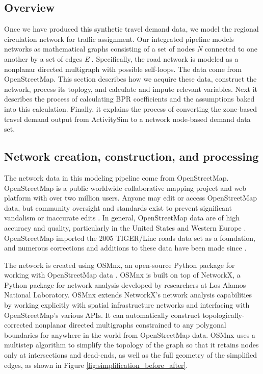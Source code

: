 \subsection{Overview}\label{network}

Once we have produced this synthetic travel demand data, we model the regional circulation network for traffic assignment. Our integrated pipeline models networks as mathematical graphs consisting of a set of nodes \textit{N} connected to one another by a set of edges \textit{E} \citep{newman_networks:_2010,gastner_spatial_2006}. Specifically, the road network is modeled as a nonplanar directed multigraph with possible self-loops. The data come from OpenStreetMap. This section describes how we acquire these data, construct the network, process its toplogy, and calculate and impute relevant variables. Next it describes the process of calculating BPR coefficients and the assumptions baked into this calculation. Finally, it explains the process of converting the zone-based travel demand output from ActivitySim to a network node-based demand data set. 

\subsection{Network creation, construction, and processing}

The network data in this modeling pipeline come from OpenStreetMap. OpenStreetMap is a public worldwide collaborative mapping project and web platform with over two million users. Anyone may edit or access OpenStreetMap data, but community oversight and standards exist to prevent significant vandalism or inaccurate edits \citep{jokar_arsanjani_openstreetmap_2015}. In general, OpenStreetMap data are of high accuracy and quality, particularly in the United States and Western Europe \citep{corcoran_analysing_2013,over_generating_2010,haklay_how_2010,maron_how_2015}. OpenStreetMap imported the 2005 TIGER/Line roads data set as a foundation, and numerous corrections and additions to these data have been made since \citep{willis_openstreetmap_2008}.

The network is created using OSMnx, an open-source Python package for working with OpenStreetMap data \citep{boeing_osmnx:_2017}. OSMnx is built on top of NetworkX, a Python package for network analysis developed by researchers at Los Alamos National Laboratory. OSMnx extends NetworkX's network analysis capabilities by working explicitly with spatial infrastructure networks and interfacing with OpenStreetMap's various APIs. It can automatically construct topologically-corrected nonplanar directed multigraphs constrained to any polygonal boundaries for anywhere in the world from OpenStreetMap data. OSMnx uses a multistep algorithm to simplify the topology of the graph so that it retains nodes only at intersections and dead-ends, as well as the full geometry of the simplified edges, as shown in Figure \ref{fig:simplification_before_after}.

